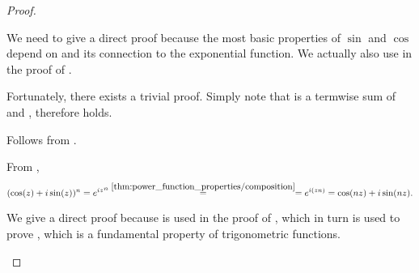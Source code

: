 \begin{proof}
  \begin{description}
     We need to give a direct proof because the most basic properties of \( \sin \) and \( \cos \) depend on  and its connection to the exponential function. We actually also use  in the proof of .

    Fortunately, there exists a trivial proof. Simply note that  is a termwise sum of  and , therefore  holds.

     Follows from .

     From ,
    \begin{equation*}
      (\cos(z) + i \sin(z))^n
      =
      {e^{iz}}^n
      \overset {\ref{thm:power_function_properties/composition}} {=}
      =
      e^{i(zn)}
      =
      \cos(nz) + i \sin(nz).
    \end{equation*}

     We give a direct proof because  is used in the proof of , which in turn is used to prove , which is a fundamental property of trigonometric functions.


\end{description}
\end{proof}
